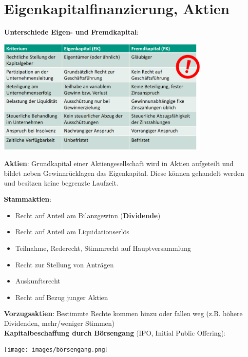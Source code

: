\section{Eigenkapitalfinanzierung, Aktien}

\textbf{Unterschiede Eigen- und Fremdkapital}:
\begin{center}
	\includegraphics[width=0.8\textwidth]{images/ef-capital.png}
\end{center}

\textbf{Aktien}: Grundkapital einer Aktiengesellschaft wird in Aktien aufgeteilt und bildet neben Gewinnrücklagen das Eigenkapital. 
Diese können gehandelt werden und besitzen keine begrenzte Laufzeit.

\textbf{Stammaktien}:
\begin{itemize}
	\item Recht auf Anteil am Bilanzgewinn (\textbf{Dividende})
	\item Recht auf Anteil am Liquidationserlös
	\item Teilnahme, Rederecht, Stimmrecht auf Hauptversammlung
	\item Recht zur Stellung von Anträgen
	\item Auskunftsrecht
	\item Recht auf Bezug junger Aktien
\end{itemize}
\bigskip
\textbf{Vorzugsaktien}: Bestimmte Rechte kommen hinzu oder fallen weg (z.B. höhere Dividenden, mehr/weniger Stimmen)\\

\textbf{Kapitalbeschaffung durch Börsengang} (IPO, Initial Public Offering):
\begin{center}
	\texttt{[image: images/börsengang.png]}
\end{center}

